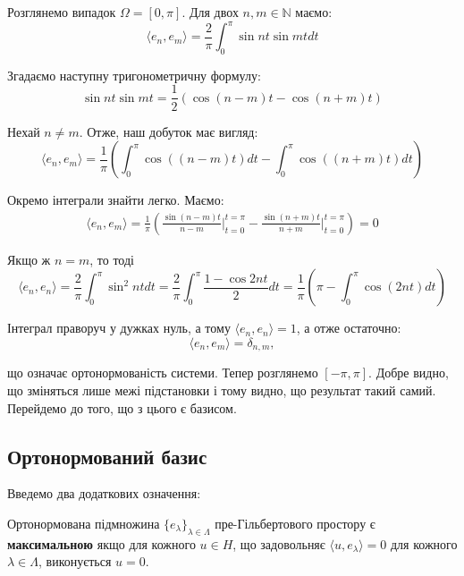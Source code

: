 \documentclass[14pt]{extarticle}
\newcommand{\<}{\langle}
\renewcommand{\>}{\rangle}
\theoremstyle{mystyle}{\newtheorem{definition}{Definition}[section]}
\theoremstyle{mystyle}{\newtheorem{proposition}[definition]{Proposition}}
\theoremstyle{mystyle}{\newtheorem{theorem}[definition]{Theorem}}
\theoremstyle{mystyle}{\newtheorem{lemma}[definition]{Lemma}}
\theoremstyle{mystyle}{\newtheorem{corollary}[definition]{Corollary}}
\theoremstyle{mystyle}{\newtheorem*{remark}{Remark}}
\theoremstyle{mystyle}{\newtheorem*{remarks}{Remarks}}
\theoremstyle{mystyle}{\newtheorem*{example}{Example}}
\theoremstyle{mystyle}{\newtheorem*{examples}{Examples}}
\theoremstyle{definition}{\newtheorem*{exercise}{Exercise}}
\theoremstyle{cstyle}{\newtheorem*{cthm}{}}
\theoremstyle{warn}
\begin{document}
Розглянемо випадок $\Omega = [0,\pi]$. Для двох $n,m \in \mathbb{N}$ маємо:
\begin{equation}
    \langle e_n, e_m \rangle = \frac{2}{\pi}\int_{0}^{\pi} \sin nt \sin mt dt
\end{equation}

Згадаємо наступну тригонометричну формулу:
\begin{equation}
    \sin nt \sin mt = \frac{1}{2}\left(\cos (n-m)t - \cos (n+m)t\right)
\end{equation}

Нехай $n \neq m$. Отже, наш добуток має вигляд:
\begin{equation}
    \langle e_n, e_m \rangle = \frac{1}{\pi}\left(\int_0^{\pi} \cos((n-m)t)dt - \int_0^{\pi} \cos((n+m)t)dt\right)
\end{equation}

Окремо інтеграли знайти легко. Маємо:
\begin{gather}
    \langle e_n, e_m \rangle = \frac{1}{\pi}\left(\frac{\sin (n-m)t}{n-m}\Big|_{t=0}^{t=\pi} - \frac{\sin(n+m)t}{n+m}\Big|_{t=0}^{t=\pi}\right) \nonumber = 0
\end{gather}

Якщо ж $n=m$, то тоді
\begin{equation}
    \langle e_n, e_n \rangle = \frac{2}{\pi}\int_0^{\pi} \sin^2 ntdt = \frac{2}{\pi}\int_0^{\pi}\frac{1-\cos 2nt}{2}dt = \frac{1}{\pi}\left(\pi-\int_0^{\pi}\cos (2nt)dt\right)
\end{equation}

Інтеграл праворуч у дужках нуль, а тому $\langle e_n, e_n \rangle=1$, а отже остаточно:
\begin{equation}
    \langle e_n, e_m \rangle = \delta_{n,m},
\end{equation}

що означає ортонормованість системи. Тепер розглянемо $[-\pi,\pi]$. Добре видно, що зміняться лише межі підстановки і тому видно, що результат такий самий. Перейдемо до того, що з цього є базисом.

\subsection{Ортонормований базис}

Введемо два додаткових означення:

\begin{definition}
    Ортонормована підмножина $\{e_{\lambda}\}_{\lambda \in \Lambda}$ пре-Гільбертового простору є \textbf{максимальною} якщо для кожного $u \in H$, що задовольняє $\langle u, e_{\lambda}\rangle=0$ для кожного $\lambda \in \Lambda$, виконується $u=0$.
\end{definition}
\end{document}
